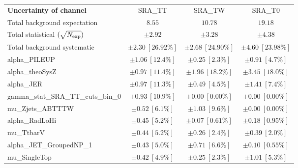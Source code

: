 
\begin{table}
\begin{center}
\setlength{\tabcolsep}{0.0pc}
\begin{tabular*}{\textwidth}{@{\extracolsep{\fill}}lccc}
\noalign{\smallskip}\hline\noalign{\smallskip}
{\bf Uncertainty of channel}                                    & SRA\_TT            & SRA\_TW            & SRA\_T0            \\
\noalign{\smallskip}\hline\noalign{\smallskip}
Total background expectation             &  $8.55$        &  $10.78$        &  $19.18$       \\
\noalign{\smallskip}\hline\noalign{\smallskip}
Total statistical $(\sqrt{N_{\rm exp}})$              & $\pm 2.92$        & $\pm 3.28$        & $\pm 4.38$       \\
Total background systematic               & $\pm 2.30\ [26.92\%] $        & $\pm 2.68\ [24.90\%] $        & $\pm 4.60\ [23.98\%] $             \\
\noalign{\smallskip}\hline\noalign{\smallskip}
\noalign{\smallskip}\hline\noalign{\smallskip}
alpha\_PILEUP         & $\pm 1.06\ [12.4\%] $          & $\pm 0.25\ [2.3\%] $          & $\pm 0.91\ [4.7\%] $       \\
alpha\_theoSysZ         & $\pm 0.97\ [11.4\%] $          & $\pm 1.96\ [18.2\%] $          & $\pm 3.45\ [18.0\%] $       \\
alpha\_JER         & $\pm 0.97\ [11.3\%] $          & $\pm 0.49\ [4.5\%] $          & $\pm 1.41\ [7.4\%] $       \\
gamma\_stat\_SRA\_TT\_cuts\_bin\_0         & $\pm 0.93\ [10.9\%] $          & $\pm 0.00\ [0.00\%] $          & $\pm 0.00\ [0.00\%] $       \\
mu\_Zjets\_ABTTTW         & $\pm 0.52\ [6.1\%] $          & $\pm 1.03\ [9.6\%] $          & $\pm 0.00\ [0.00\%] $       \\
alpha\_RadLoHi         & $\pm 0.45\ [5.2\%] $          & $\pm 0.07\ [0.61\%] $          & $\pm 0.18\ [0.95\%] $       \\
mu\_TtbarV         & $\pm 0.44\ [5.2\%] $          & $\pm 0.26\ [2.4\%] $          & $\pm 0.39\ [2.0\%] $       \\
alpha\_JET\_GroupedNP\_1         & $\pm 0.43\ [5.0\%] $          & $\pm 0.71\ [6.6\%] $          & $\pm 0.10\ [0.55\%] $       \\
mu\_SingleTop         & $\pm 0.42\ [4.9\%] $          & $\pm 0.25\ [2.3\%] $          & $\pm 1.01\ [5.3\%] $       \\

\end{tabular*}
\end{center}
\end{table}
